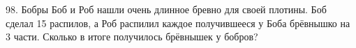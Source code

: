 98. Бобры Боб и Роб нашли очень длинное бревно для своей плотины. Боб сделал 15 распилов, а Роб распилил каждое получившееся у Боба брёвнышко на 3 части. Сколько в итоге получилось брёвнышек у бобров?\\

